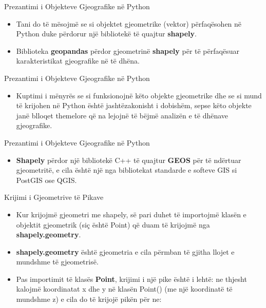 \documentclass[
  ignorenonframetext,
]{beamer}
\providecommand{\tightlist}{%
  \setlength{\itemsep}{0pt}\setlength{\parskip}{0pt}}
\begin{document}
\begin{frame}{Prezantimi i Objekteve Gjeografike në Python}
\protect\hypertarget{prezantimi-i-objekteve-gjeografike-nuxeb-python}{}
\begin{itemize}
\item
  Tani do të mësojmë se si objektet gjeometrike (vektor) përfaqësohen në
  Python duke përdorur një bibliotekë të quajtur \textbf{shapely}.
\item
  Biblioteka \textbf{geopandas} përdor gjeometrinë \textbf{shapely} për
  të përfaqësuar karakteristikat gjeografike në të dhëna.
\end{itemize}
\end{frame}

\begin{frame}{Prezantimi i Objekteve Gjeografike në Python}
\protect\hypertarget{prezantimi-i-objekteve-gjeografike-nuxeb-python-1}{}
\begin{itemize}
\tightlist
\item
  Kuptimi i mënyrës se si funksionojnë këto objekte gjeometrike dhe se
  si mund të krijohen në Python është jashtëzakonisht i dobishëm, sepse
  këto objekte janë blloqet themelore që na lejojnë të bëjmë analizën e
  të dhënave gjeografike.
\end{itemize}
\end{frame}

\begin{frame}{Prezantimi i Objekteve Gjeografike në Python}
\protect\hypertarget{prezantimi-i-objekteve-gjeografike-nuxeb-python-2}{}
\begin{itemize}
\tightlist
\item
  \textbf{Shapely} përdor një bibliotekë C++ të quajtur \textbf{GEOS}
  për të ndërtuar gjeometritë, e cila është një nga bibliotekat
  standarde e softeve GIS si PostGIS ose QGIS.
\end{itemize}
\end{frame}

\begin{frame}{Krijimi i Gjeometrive të Pikave}
\protect\hypertarget{krijimi-i-gjeometrive-tuxeb-pikave}{}
\begin{itemize}
\item
  Kur krijojmë gjeometri me shapely, së pari duhet të importojmë klasën
  e objektit gjeometrik (siç është Point) që duam të krijojmë nga
  \textbf{shapely.geometry}.
\item
  \textbf{shapely.geometry} është gjeometria e cila përmban të gjitha
  llojet e mundshme të gjeometrisë.
\item
  Pas importimit të klasës \textbf{Point}, krijimi i një pike është i
  lehtë: ne thjesht kalojmë koordinatat x dhe y në klasën Point() (me
  një koordinatë të mundshme z) e cila do të krijojë pikën për ne:
\end{itemize}
\end{frame}
\end{document}

